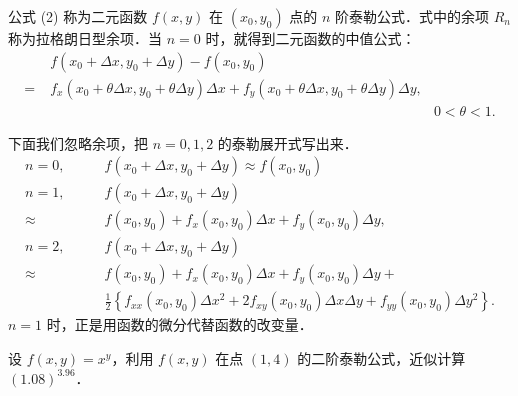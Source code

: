 公式 (2) 称为二元函数 $f(x,y)$ 在 $(x_{0},y_{0})$ 点的 $n$ 阶泰勒公式．式中的余项 $R_{n}$ 称为拉格朗日型余项．当 $n=0$ 时，就得到二元函数的中值公式：
\begin{equation}
\begin{aligned}
&f\left(x_{0}+\Delta x,y_{0}+\Delta y\right)-f\left(x_{0},y_{0}\right)\\
=\;&f_{x}\left(x_{0}+\theta\Delta x,y_{0}+\theta\Delta y\right)\Delta x+f_{y}\left(x_{0}+\theta\Delta x,y_{0}+\theta\Delta y\right)\Delta y,\\
&&0<\theta<1.
\end{aligned}
\tag{3}
\end{equation}

下面我们忽略余项，把 $n=0,1,2$ 的泰勒展开式写出来．
\[
\begin{aligned}
n=0,\qquad&f\left(x_{0}+\Delta x,y_{0}+\Delta y\right)\approx f\left(x_{0},y_{0}\right)\\
n=1,\qquad&f\left(x_{0}+\Delta x,y_{0}+\Delta y\right)\\
\approx\;&f\left(x_{0},y_{0}\right)+f_{x}\left(x_{0},y_{0}\right)\Delta x+f_{y}\left(x_{0},y_{0}\right)\Delta y,\\
n=2,\qquad&f\left(x_{0}+\Delta x,y_{0}+\Delta y\right)\\
\approx\;&f\left(x_{0},y_{0}\right)+f_{x}\left(x_{0},y_{0}\right)\Delta x+f_{y}\left(x_{0},y_{0}\right)\Delta y+\\
&\frac{1}{2}\left\{f_{xx}\left(x_{0},y_{0}\right)\Delta x^{2}+2f_{xy}\left(x_{0},y_{0}\right)\Delta x\Delta y+f_{yy}\left(x_{0},y_{0}\right)\Delta y^{2}\right\}.
\end{aligned}
\]
$n=1$ 时，正是用函数的微分代替函数的改变量．

\begin{example}\label{ex:16-5-1}
设 $f(x,y)=x^{y}$，利用 $f(x,y)$ 在点 $(1,4)$ 的二阶泰勒公式，近似计算 $(1.08)^{3.96}$．
\end{example}

